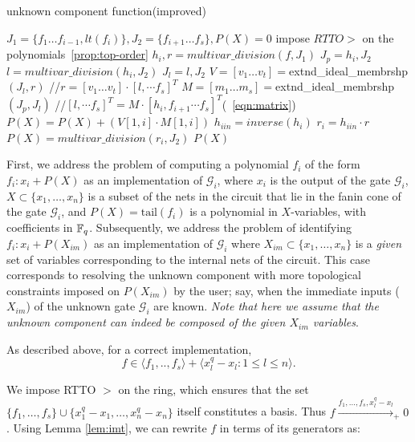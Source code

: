 \begin{algorithm}
\caption{unknown component function(improved)}\label{pseudoucimp}
\begin{algorithmic}[1]
\State $J_1=\{f_1\dots f_{i-1},lt(f_i)\},J_2=\{f_{i+1}\dots f_s\},P(X)=0$
\State impose $RTTO >$ on the polynomials~\ref{prop:top-order}
\State $h_i,r = multivar\_division(f,J_1)$
\State $J_p = h_i,J_2$
\State $l=multivar\_division(h_i,J_2)$
\State $J_l = l,J_2$
\State $V=[v_1\dots v_t]=$extnd\_ideal\_membrshp$(J_l,r)$ //$r=[v_1\dots v_t]\cdot[l,\cdots f_s]^T$
\State $M=[m_1\dots m_s]=$extnd\_ideal\_membrshp$(J_p,J_l)$ //$[l,\cdots f_s]^T = M\cdot[h_i,f_{i+1}\cdots f_s]^T$(~\autoref{eqn:matrix})
\State $P(X) = P(X)+(V[1,i]\cdot M[1,i])$
\EndFor
\Else
\State $h_{iin}=inverse(h_i)$
\State $r_i=h_{iin}\cdot r$
\State $P(X)=multivar\_division(r_i,J_2)$
\EndIf
\State \Return $P(X)$
\EndProcedure
\end{algorithmic}
\end{algorithm}

First, we address the problem of computing a polynomial
$f_i$ of the form $f_i:x_i+P(X)$ as an implementation of
$\mathcal{G}_i$, where $x_i$ is the output of the gate
$\mathcal{G}_i$, $X \subset \{x_1,\dots,x_n\}$ is a subset of the nets
in the circuit that lie in the fanin cone of the gate $\mathcal{G}_i$,
and $P(X) = \text{tail}(f_i)$ is a polynomial in $X$-variables,
with coefficients in ${\mathbb{F}}_{q}$. Subsequently, we address the problem of
identifying $f_i:x_i+P(X_{im})$ as an implementation of
$\mathcal{G}_i$ where  $X_{im} \subset \{x_1,\dots,x_n\}$ is a {\it
  given} set of variables corresponding to the internal nets of the
circuit. This case corresponds to resolving the unknown component with
more topological constraints imposed on $P(X_{im})$ by the user; say,
when the immediate inputs ($X_{im}$) of the unknown gate
$\mathcal{G}_i$ are known.  {\it Note that here we assume that the
  unknown component can indeed be composed of the given $X_{im}$
  variables}. 


As described above, for a correct implementation,
$$f \in \langle f_1,..,f_s\rangle + \langle x_l^q-x_l: 1\le l \le n\rangle.$$

We impose RTTO $>$ on the ring, which ensures that the set
$\{f_1,\dots,f_s\}\cup \{x_1^q-x_1,\dots,x_n^q-x_n\}$ itself
constitutes a \Grobner basis. Thus
$f\xrightarrow{f_1,\dots,f_s,x_l^q-x_l}_+0$. Using Lemma
\ref{lem:imt}, we can rewrite $f$ in terms of its generators as:   

